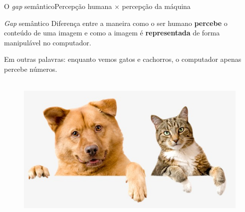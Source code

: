 \documentclass{beamer}
\begin{document}
    \begin{frame}{O \emph{gap} semântico}{Percepção humana $\times$ percepção da máquina}

        \begin{block}{\emph{Gap} semântico}
            Diferença entre a maneira como o ser humano \textbf{percebe} o conteúdo de uma imagem
            e como a imagem é \textbf{representada} de forma manipulável no computador.
        \end{block}

        \vspace{.2cm}

        \pause

        Em outras palavras: enquanto vemos gatos e cachorros, o computador apenas
        percebe números.\\~\\

        \begin{figure}
            \centering
            \includegraphics[scale=0.3]{img/gatocachorro.jpg}
        \end{figure}

        \pause


    \end{frame}
\end{document}
